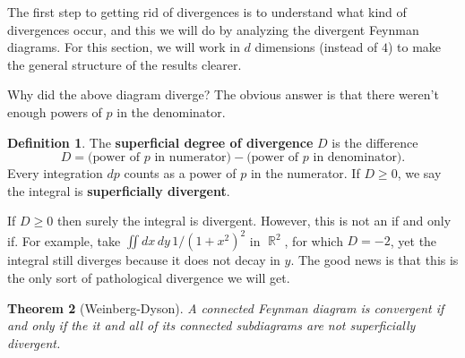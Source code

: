 \documentclass{report}
\theoremstyle{plain}
\newtheorem{theorem}{Theorem}[section]
\theoremstyle{definition}
\newtheorem{definition}[theorem]{Definition}
\theoremstyle{remark}
\DeclareMathOperator{\bR}{\mathbb{R}}
\begin{document}
The first step to getting rid of divergences is to understand what
kind of divergences occur, and this we will do by analyzing the
divergent Feynman diagrams. For this section, we will work in $d$
dimensions (instead of $4$) to make the general structure of the
results clearer.

Why did the above diagram diverge? The obvious answer is that there
weren't enough powers of $p$ in the denominator.

\begin{definition}
  The {\bf superficial degree of divergence} $D$ is the difference
  $$ D = \text{(power of } p \text{ in numerator)} - \text{(power of } p \text{ in denominator)}. $$
  Every integration $dp$ counts as a power of $p$ in the numerator. If
  $D \ge 0$, we say the integral is {\bf superficially divergent}.
\end{definition}

If $D \ge 0$ then surely the integral is divergent. However, this is
not an if and only if. For example, take
$\iint dx \, dy \, 1/(1 + x^2)^2$ in $\bR^2$, for which $D = -2$, yet
the integral still diverges because it does not decay in $y$. The good
news is that this is the only sort of pathological divergence we will
get.

\begin{theorem}[Weinberg-Dyson]
  A connected Feynman diagram is convergent if and only if the it and
  all of its connected subdiagrams are not superficially divergent.
\end{theorem}
\end{document}
